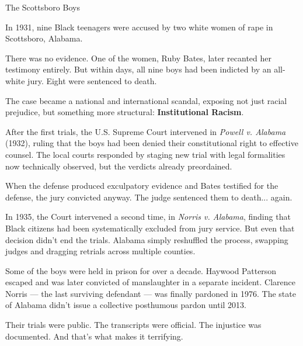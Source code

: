 \begin{HistoricalSidebar}{The Scottsboro Boys}

  In 1931, nine Black teenagers were accused by two white women of rape in Scottsboro, Alabama.
  
  \medskip
  
  There was no evidence. One of the women, Ruby Bates, later recanted her testimony entirely.  
  But within days, all nine boys had been indicted by an all-white jury. Eight were sentenced to death.
  
  \medskip
  
  The case became a national and international scandal, exposing not just racial prejudice, but something more structural:  
  \textbf{Institutional Racism}.
  
  \medskip
  
  After the first trials, the U.S. Supreme Court intervened in \textit{Powell v. Alabama} (1932), ruling that the boys 
  had been denied their constitutional right to effective counsel.  
  The local courts responded by staging new trial with legal formalities now technically observed, but the 
  verdicts already preordained.
  
  \medskip
  
  When the defense produced exculpatory evidence and Bates testified for the defense, the jury convicted anyway.  
  The judge sentenced them to death... again.
  
  \medskip
  
  In 1935, the Court intervened a second time, in \textit{Norris v. Alabama}, finding that Black citizens had been 
  systematically excluded from jury service.  
  But even that decision didn’t end the trials. Alabama simply reshuffled the process, swapping judges and dragging 
  retrials across multiple counties.
  
  \medskip
  
  Some of the boys were held in prison for over a decade. Haywood Patterson escaped and was later convicted of 
  manslaughter in a separate incident.  
  Clarence Norris — the last surviving defendant — was finally pardoned in 1976.  
  The state of Alabama didn’t issue a collective posthumous pardon until 2013.
  
  \medskip
  
  Their trials were public. 
  The transcripts were official. 
  The injustice was documented.
  And that’s what makes it terrifying.
  
  \end{HistoricalSidebar}
  

